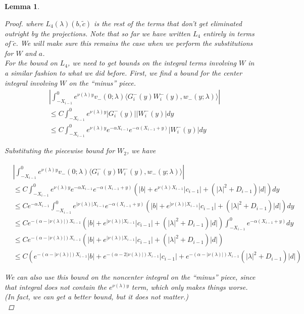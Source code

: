 \documentclass[12pt]{article}
\newtheorem{lemma}{Lemma}
\begin{document}
\begin{lemma}
\begin{proof}
where $L_4(\lambda)(b, \tilde{c})$ is the rest of the terms that don't get eliminated outright by the projections. Note that so far we have written $L_4$ entirely in terms of $\tilde{c}$. We will make sure this remains the case when we perform the substitutions for $W$ and $a$.\\

For the bound on $L_4$, we need to get bounds on the integral terms involving $W$ in a similar fashion to what we did before. First, we find a bound for the center integral involving $W$ on the ``minus'' piece.\\

\begin{align*}
&\left| \int_{-X_{i-1}}^0
e^{\nu(\lambda)y} v_-(0; \lambda) \langle G_i^-(y)W_i^-(y), w_-(y; \lambda) \rangle \right| \\
&\leq C \int_{-X_{i-1}}^0 e^{\nu(\lambda)y} |G_i^-(y)| |W_i^-(y)| dy \\
&\leq C \int_{-X_{i-1}}^0 e^{\nu(\lambda)y} e^{-\alpha X_{i-1}} e^{-\alpha(X_{i-1} + y)} |W_i^-(y)| dy
\end{align*}

Substituting the piecewise bound for $W_2$, we have

\begin{align*}
&\left| \int_{-X_{i-1}}^0
e^{\nu(\lambda)y} v_-(0; \lambda) \langle G_i^-(y)W_i^-(y), w_-(y; \lambda) \rangle \right| \\
&\leq C \int_{-X_{i-1}}^0 e^{\nu(\lambda)y} e^{-\alpha X_{i-1}} e^{-\alpha(X_{i-1} + y)} ( |b| + e^{\nu(\lambda)X_{i-1}}|c_{i-1}| + (|\lambda|^2 + D_{i-1})|d| )dy \\
&\leq C e^{-\alpha X_{i-1}} \int_{-X_{i-1}}^0 e^{|\nu(\lambda)|X_{i-1}} e^{-\alpha(X_{i-1} + y)} ( |b| + e^{|\nu(\lambda)|X_{i-1}}|c_{i-1}| + (|\lambda|^2 + D_{i-1})|d| )dy \\
&\leq C e^{-(\alpha - |\nu(\lambda)|) X_{i-1}} ( |b| + e^{|\nu(\lambda)|X_{i-1}}|c_{i-1}| + (|\lambda|^2 + D_{i-1})|d| ) \int_{-X_{i-1}}^0 e^{-\alpha(X_{i-1} + y)} dy \\
&\leq C e^{-(\alpha - |\nu(\lambda)|) X_{i-1}} ( |b| + e^{|\nu(\lambda)|X_{i-1}}|c_{i-1}| + (|\lambda|^2 + D_{i-1})|d| ) \\
&\leq C ( e^{-(\alpha - |\nu(\lambda)|) X_{i-1}} |b| + e^{-(\alpha - 2 |\nu(\lambda)|) X_{i-1}}|c_{i-1}| + e^{-(\alpha - |\nu(\lambda)|) X_{i-1}} (|\lambda|^2 + D_{i-1})|d| )
\end{align*}

We can also use this bound on the noncenter integral on the ``minus'' piece, since that integral does not contain the $e^{\nu(\lambda)y}$ term, which only makes things worse. (In fact, we can get a better bound, but it does not matter.)\\


\end{proof}
\end{lemma}
\end{document}
